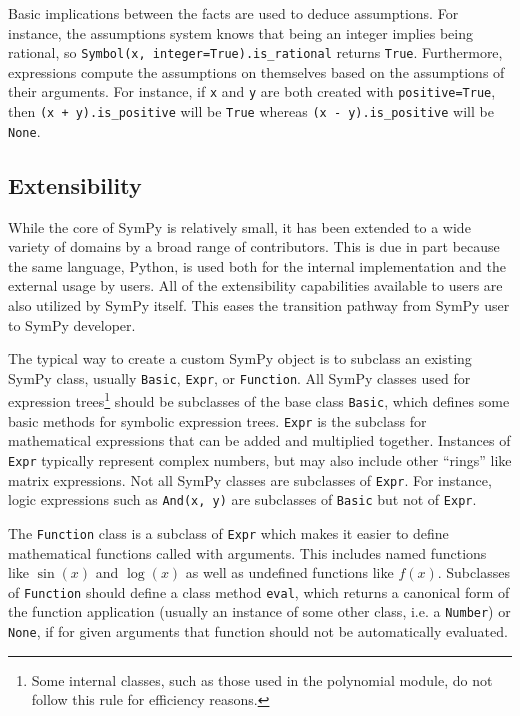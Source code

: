 Basic implications between the facts are used to deduce assumptions. For
instance, the assumptions system knows that being an integer implies being
rational, so \texttt{Symbol(\textquotesingle{}x\textquotesingle{}, integer=True).is\_rational} returns
\texttt{True}. Furthermore, expressions compute the assumptions on themselves
based on the assumptions of their arguments. For instance, if \texttt{x} and
\texttt{y} are both created with \texttt{positive=True}, then
\texttt{(x + y).is\_positive} will be \texttt{True} whereas
\texttt{(x - y).is\_positive} will be \texttt{None}.


\subsection{Extensibility}

While the core of SymPy is relatively small, it has been extended to a wide variety
of domains by a broad range of contributors.  This is due in part because the
same language, Python, is used both for the internal implementation and the
external usage by users.  All of the extensibility capabilities available to
users are also utilized by SymPy itself. This eases the transition pathway from
SymPy user to SymPy developer.

The typical way to create a custom SymPy object is to subclass an existing
SymPy class, usually  \texttt{Basic}, \texttt{Expr}, or
\texttt{Function}. All SymPy classes used for expression trees\footnote{Some
  internal classes, such as those used in the polynomial module, do not follow
  this rule for efficiency reasons.} should be subclasses of the base class
\texttt{Basic}, which defines some basic methods for symbolic expression
trees. \texttt{Expr} is the subclass for mathematical expressions that can be
added and multiplied together. Instances of \texttt{Expr} typically represent
complex numbers, but may also include other ``rings'' like matrix expressions.
Not all SymPy classes are subclasses of \texttt{Expr}. For instance, logic expressions such
as \verb|And(x, y)| are subclasses of \texttt{Basic} but not of \texttt{Expr}.

The \texttt{Function} class is a subclass of \texttt{Expr} which makes it
easier to define mathematical functions called with arguments. This includes
named functions like $\sin(x)$ and $\log(x)$ as well as undefined functions
like $f(x)$. Subclasses of \texttt{Function} should define a
class method \texttt{eval}, which returns a canonical form of the function
application (usually an instance of some other class, i.e. a \texttt{Number})
or \texttt{None}, if for given arguments that function should not be
automatically evaluated.

